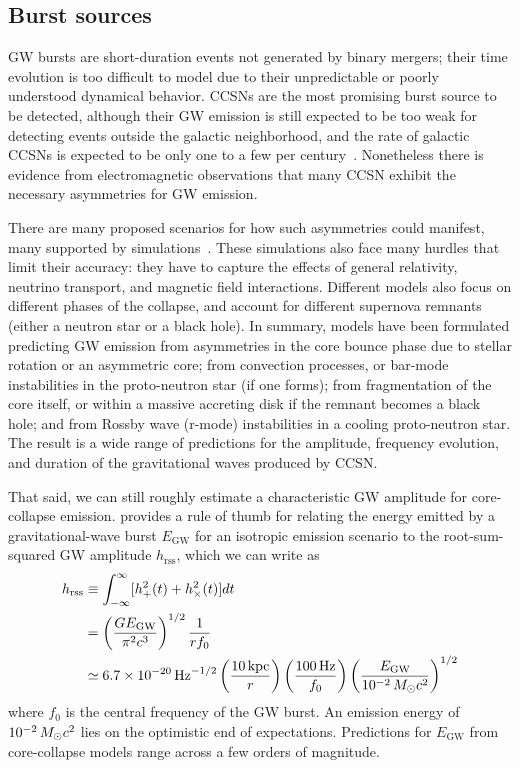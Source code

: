 \subsection{Burst sources}

GW bursts are short-duration events not generated by binary mergers; their time evolution is too difficult to model due to their unpredictable or poorly understood dynamical behavior.
\acp{CCSN} are the most promising burst source to be detected, although their \ac{GW} emission is still expected to be too weak for detecting events outside the galactic neighborhood, and the rate of galactic \acp{CCSN} is expected to be only one to a few per century~\citep{Adams_2013, Maoz_2010}.
Nonetheless there is evidence from electromagnetic observations that many CCSN exhibit the necessary asymmetries for GW emission.

There are many proposed scenarios for how such asymmetries could manifest, many supported by simulations~\citep{Fryer_2011, Fryer_2002}.
These simulations also face many hurdles that limit their accuracy: they have to capture the effects of general relativity, neutrino transport, and magnetic field interactions.
Different models also focus on different phases of the collapse, and account for different supernova remnants (either a neutron star or a black hole).
In summary, models have been formulated predicting GW emission from asymmetries in the core bounce phase due to stellar rotation or an asymmetric core; from convection processes, or bar-mode instabilities in the proto-neutron star (if one forms); from fragmentation of the core itself, or within a massive accreting disk if the remnant becomes a black hole; and from Rossby wave (r-mode) instabilities in a cooling proto-neutron star.
The result is a wide range of predictions for the amplitude, frequency evolution, and duration of the gravitational waves produced by CCSN.

That said, we can still roughly estimate a characteristic GW amplitude for core-collapse emission.
\citet{Sutton_2013} provides a rule of thumb for relating the energy emitted by a gravitational-wave burst $E_{\mathrm{GW}}$ for an isotropic emission scenario to the root-sum-squared GW amplitude $h_{\mathrm{rss}}$, which we can write as
\begin{align}
	\label{gw-hrss}
	h_{\mathrm{rss}}
		&\equiv \int_{-\infty}^{\infty} [h_+^2(t) + h_{\times}^2(t)] dt\\
		\label{gw-egw}
		&= \left( \frac{G E_{\mathrm{GW}}}{\pi^2 c^3} \right)^{1/2} \frac{1}{r f_0}\\
		&\simeq 6.7 \times 10^{-20}\,\mathrm{Hz}^{-1/2}
			\left( \frac{10\,\mathrm{kpc}}{r} \right)
			\left( \frac{100\,\mathrm{Hz}}{f_0} \right)
			\left( \frac{E_{\mathrm{GW}}}{10^{-2}\,M_{\odot} c^2} \right)^{1/2}
\end{align}
where $f_0$ is the central frequency of the GW burst.
An emission energy of $10^{-2}\,M_{\odot} c^2$ lies on the optimistic end of expectations.
Predictions for $E_{\mathrm{GW}}$ from core-collapse models range across a few orders of magnitude.

